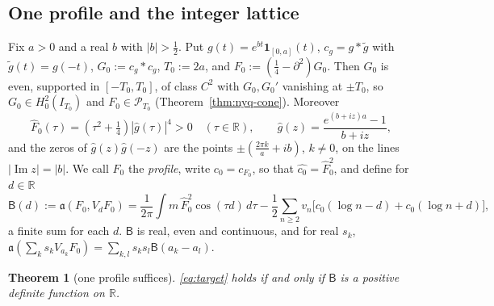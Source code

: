 \documentclass[11pt]{amsart}
\newtheorem{theorem}{Theorem}[section]
\theoremstyle{definition}
\theoremstyle{remark}
\newcommand{\R}{\mathbb R}
\newcommand{\Iml}{\operatorname{Im}}
\newcommand{\Fh}{\widehat F}
\begin{document}
\subsection{One profile and the integer lattice}\label{subsec:oneprofile}
Fix $a>0$ and a real $b$ with $|b|>\frac12$. Put $g(t)=e^{bt}\mathbf 1_{[0,a]}(t)$, $c_g=g*\tilde g$ with $\tilde g(t)=g(-t)$,
$G_0:=c_g*c_g$, $T_0:=2a$, and $F_0:=(\frac14-\partial^2)G_0$. Then $G_0$ is even, supported in $[-T_0,T_0]$, of class $C^2$ with
$G_0,G_0'$ vanishing at $\pm T_0$, so $G_0\in H^2_0(I_{T_0})$ and $F_0\in\mathcal P_{T_0}$ (Theorem~\ref{thm:nyq-cone}). Moreover
\[
\Fh_0(\tau)=(\tau^2+\tfrac14)|\widehat g(\tau)|^4>0\quad(\tau\in\R),\qquad \widehat g(z)=\frac{e^{(b+iz)a}-1}{b+iz},
\]
and the zeros of $\widehat g(z)\widehat g(-z)$ are the points $\pm(\frac{2\pi k}a+ib)$, $k\ne0$, on the lines $|\Iml z|=|b|$. We call $F_0$ the
\emph{profile}, write $c_0=c_{F_0}$, so that $\widehat{c_0}=\Fh_0^2$, and define for $d\in\R$
\[
\mathsf B(d):=\mathfrak a(F_0,V_dF_0)=\frac1{2\pi}\int m\,\Fh_0^2\cos(\tau d)\,d\tau-\frac12\sum_{n\ge2}v_n\big[c_0(\log n-d)+c_0(\log n+d)\big],
\]
a finite sum for each $d$. $\mathsf B$ is real, even and continuous, and for real $s_k$, $\mathfrak a(\sum_ks_kV_{a_k}F_0)=\sum_{k,l}s_ks_l\mathsf B(a_k-a_l)$.

\begin{theorem}[one profile suffices]\label{thm:oneprofile}
\eqref{eq:target} holds if and only if $\mathsf B$ is a positive definite function on $\R$.
\end{theorem}
\end{document}
